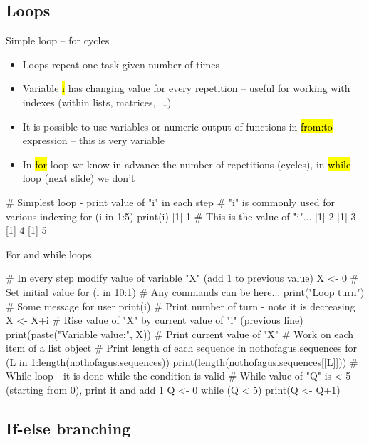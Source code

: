 \documentclass[compress, ucs, xelatex, 11pt, xcolor=svgnames,
  hyperref={
    bookmarks=true,
    unicode=true,
    colorlinks=true,
    pdftitle={Molecular data in R},
    plainpages=false,
    pdfauthor={Vojtech Zeisek},
    pdfsubject={Course about phylogeny and evolution in R},
    pdfcreator={XeLaTeX},
    pdfkeywords={R, evolution, phylogeny, molecular data},
    linkcolor=Tomato,
    anchorcolor=SaddleBrown,
    citecolor=Goldenrod,
    filecolor=DarkMagenta,
    menucolor=Sienna,
    urlcolor=DarkTurquoise,
    pdftex},
  url={hyphens, lowtilde} %
  ]{beamer}
\renewcommand{\texttt}[1]{\hl{\ttfamily #1}}
\begin{document}
\subsection{Loops}

\begin{frame}[fragile]{Simple loop -- for cycles}
  \begin{itemize}
    \item Loops repeat one task given number of times
    \item Variable \texttt{i} has changing value for every repetition -- useful for working with indexes (within lists, matrices,~\ldots)
    \item It is possible to use variables or numeric output of functions in \texttt{from:to} expression -- this is very variable
    \item In \texttt{for} loop we know in advance the number of repetitions (cycles), in \texttt{while} loop (next slide) we don't
  \end{itemize}
  \begin{spluscode}
    # Simplest loop - print value of "i" in each step
    # "i" is commonly used for various indexing
    for (i in 1:5) { print(i) }
    [1] 1 # This is the value of "i"...
    [1] 2
    [1] 3
    [1] 4
    [1] 5
  \end{spluscode}
\end{frame}

\begin{frame}[fragile]{For and while loops}
  \begin{spluscode}
    # In every step modify value of variable "X" (add 1 to previous value)
    X <- 0 # Set initial value
    for (i in 10:1) {
      # Any commands can be here...
      print("Loop turn") # Some message for user
      print(i) # Print number of turn - note it is decreasing
      X <- X+i # Rise value of "X" by current value of "i" (previous line)
      print(paste("Variable value:", X)) # Print current value of "X"
      }
    # Work on each item of a list object
    # Print length of each sequence in nothofagus.sequences
    for (L in 1:length(nothofagus.sequences)) {
      print(length(nothofagus.sequences[[L]]))
      }
    # While loop - it is done while the condition is valid
    # While value of "Q" is < 5 (starting from 0), print it and add 1
    Q <- 0
    while (Q < 5) { print(Q <- Q+1) }
  \end{spluscode}
\end{frame}

\subsection{If-else branching}
\end{document}
